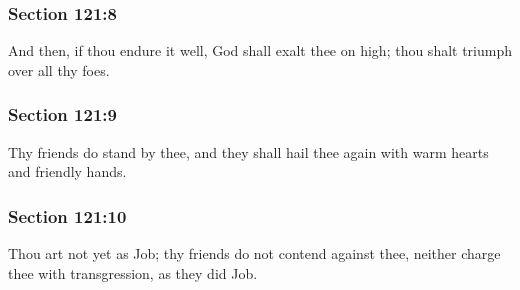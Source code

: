 	\subsubsection{Section 121:8} %
		\label{DC121-8}

		And then, if thou endure it well, God shall exalt thee on high; thou shalt triumph over all thy foes.


	\subsubsection{Section 121:9} %
		\label{DC121-9}

		Thy friends do stand by thee, and they shall hail thee again with warm hearts and friendly hands.


	\subsubsection{Section 121:10} %
		\label{DC121-10}

		Thou art not yet as Job; thy friends do not contend against thee, neither charge thee with transgression, as they did Job.


